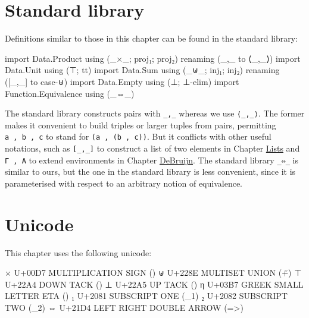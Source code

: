\hypertarget{standard-library}{%
\section{Standard library}\label{standard-library}}

Definitions similar to those in this chapter can be found in the
standard library:

\begin{fence}
\begin{code}
import Data.Product using (_×_; proj₁; proj₂) renaming (_,_ to ⟨_,_⟩)
import Data.Unit using (⊤; tt)
import Data.Sum using (_⊎_; inj₁; inj₂) renaming ([_,_] to case-⊎)
import Data.Empty using (⊥; ⊥-elim)
import Function.Equivalence using (_⇔_)
\end{code}
\end{fence}

The standard library constructs pairs with \texttt{\_,\_} whereas we use
\texttt{⟨\_,\_⟩}. The former makes it convenient to build triples or
larger tuples from pairs, permitting \texttt{a\ ,\ b\ ,\ c} to stand for
\texttt{(a\ ,\ (b\ ,\ c))}. But it conflicts with other useful
notations, such as \texttt{{[}\_,\_{]}} to construct a list of two
elements in Chapter \protect\hyperlink{Lists}{Lists} and
\texttt{Γ\ ,\ A} to extend environments in Chapter
\protect\hyperlink{DeBruijn}{DeBruijn}. The standard library
\texttt{\_⇔\_} is similar to ours, but the one in the standard library
is less convenient, since it is parameterised with respect to an
arbitrary notion of equivalence.

\hypertarget{unicode}{%
\section{Unicode}\label{unicode}}

This chapter uses the following unicode:

\begin{myDisplay}
×  U+00D7  MULTIPLICATION SIGN (\x)
⊎  U+228E  MULTISET UNION (\u+)
⊤  U+22A4  DOWN TACK (\top)
⊥  U+22A5  UP TACK (\bot)
η  U+03B7  GREEK SMALL LETTER ETA (\eta)
₁  U+2081  SUBSCRIPT ONE (\_1)
₂  U+2082  SUBSCRIPT TWO (\_2)
⇔  U+21D4  LEFT RIGHT DOUBLE ARROW (\<=>)
\end{myDisplay}

